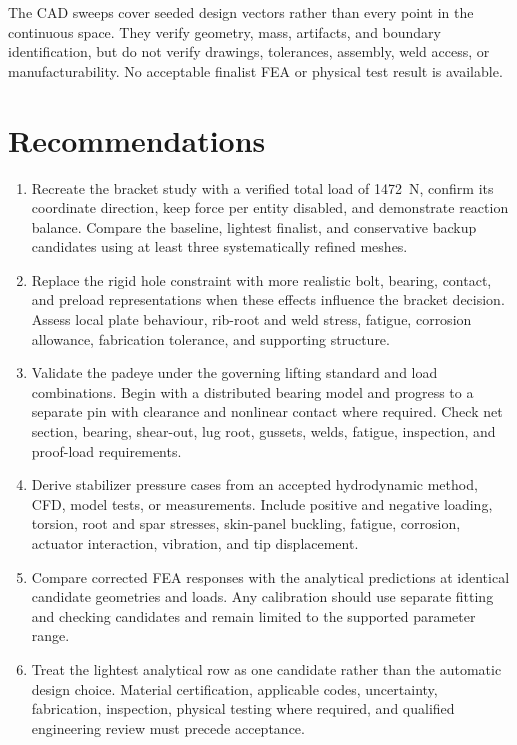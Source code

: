 The CAD sweeps cover seeded design vectors rather than every point in the
continuous space. They verify geometry, mass, artifacts, and boundary
identification, but do not verify drawings, tolerances, assembly, weld access,
or manufacturability. No acceptable finalist FEA or physical test result is
available.

\section{Recommendations}
\label{sec:recommendations}

\begin{enumerate}
    \item Recreate the bracket study with a verified total load of 1472~N,
    confirm its coordinate direction, keep force per entity disabled, and
    demonstrate reaction balance. Compare the baseline, lightest finalist, and
    conservative backup candidates using at least three systematically refined
    meshes.
    \item Replace the rigid hole constraint with more realistic bolt, bearing,
    contact, and preload representations when these effects influence the
    bracket decision. Assess local plate behaviour, rib-root and weld stress,
    fatigue, corrosion allowance, fabrication tolerance, and supporting
    structure.
    \item Validate the padeye under the governing lifting standard and load
    combinations. Begin with a distributed bearing model and progress to a
    separate pin with clearance and nonlinear contact where required. Check
    net section, bearing, shear-out, lug root, gussets, welds, fatigue,
    inspection, and proof-load requirements.
    \item Derive stabilizer pressure cases from an accepted hydrodynamic method,
    CFD, model tests, or measurements. Include positive and negative loading,
    torsion, root and spar stresses, skin-panel buckling, fatigue, corrosion,
    actuator interaction, vibration, and tip displacement.
    \item Compare corrected FEA responses with the analytical predictions at
    identical candidate geometries and loads. Any calibration should use
    separate fitting and checking candidates and remain limited to the
    supported parameter range.
    \item Treat the lightest analytical row as one candidate rather than the
    automatic design choice. Material certification, applicable codes,
    uncertainty, fabrication, inspection, physical testing where required,
    and qualified engineering review must precede acceptance.
\end{enumerate}

